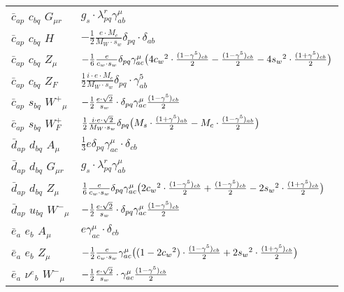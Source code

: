 \begin{center}
\begin{tabular}{|l|l|}
$\bar{c}{}_{a p }$ \phantom{-} $c{}_{b q }$ \phantom{-} ${G}_{\mu r }$ \phantom{-}  &
	$ g_s\cdot \lambda_{p q}^r \gamma_{a b}^\mu $\\[2mm]
$\bar{c}{}_{a p }$ \phantom{-} $c{}_{b q }$ \phantom{-} ${H}_{}$ \phantom{-}  &
	$-\frac{1}{2}\frac{ e \cdot M_c}{ M_W \cdot s_w}\delta_{p q} \cdot \delta_{a b} $\\[2mm]
$\bar{c}{}_{a p }$ \phantom{-} $c{}_{b q }$ \phantom{-} ${Z}_{\mu }$ \phantom{-}  &
	$-\frac{1}{6}\frac{ e}{ c_w \cdot s_w}\delta_{p q} \gamma_{a c}^\mu \big(4 c_w{}^2 \cdot {(1-\gamma^5)_{c b}\over 2} -{(1-\gamma^5)_{c b}\over 2} -4 s_w{}^2 \cdot {(1+\gamma^5)_{c b}\over 2} \big)$\\[2mm]
$\bar{c}{}_{a p }$ \phantom{-} $c{}_{b q }$ \phantom{-} $Z_F{}_{}$ \phantom{-}  &
	$\frac{1}{2}\frac{ i \cdot e \cdot M_c}{ M_W \cdot s_w}\delta_{p q} \cdot \gamma_{a b}^5 $\\[2mm]
$\bar{c}{}_{a p }$ \phantom{-} $s{}_{b q }$ \phantom{-} $W^+{}_{\mu }$ \phantom{-}  &
	$-\frac{1}{2}\frac{ e \cdot\sqrt{2}}{ s_w}\cdot \delta_{p q} \gamma_{a c}^\mu {(1-\gamma^5)_{c b}\over 2} $\\[2mm]
$\bar{c}{}_{a p }$ \phantom{-} $s{}_{b q }$ \phantom{-} $W^+_F{}_{}$ \phantom{-}  &
	$\frac{1}{2}\frac{ i \cdot e \cdot\sqrt{2}}{ M_W \cdot s_w}\delta_{p q} \big( M_s\cdot {(1+\gamma^5)_{a b}\over 2} - M_c\cdot {(1-\gamma^5)_{a b}\over 2} \big)$\\[2mm]
$\bar{d}{}_{a p }$ \phantom{-} $d{}_{b q }$ \phantom{-} ${A}_{\mu }$ \phantom{-}  &
	$\frac{1}{3} e\delta_{p q} \gamma_{a c}^\mu \cdot \delta_{c b} $\\[2mm]
$\bar{d}{}_{a p }$ \phantom{-} $d{}_{b q }$ \phantom{-} ${G}_{\mu r }$ \phantom{-}  &
	$ g_s\cdot \lambda_{p q}^r \gamma_{a b}^\mu $\\[2mm]
$\bar{d}{}_{a p }$ \phantom{-} $d{}_{b q }$ \phantom{-} ${Z}_{\mu }$ \phantom{-}  &
	$\frac{1}{6}\frac{ e}{ c_w \cdot s_w}\delta_{p q} \gamma_{a c}^\mu \big(2 c_w{}^2 \cdot {(1-\gamma^5)_{c b}\over 2} +{(1-\gamma^5)_{c b}\over 2} -2 s_w{}^2 \cdot {(1+\gamma^5)_{c b}\over 2} \big)$\\[2mm]
$\bar{d}{}_{a p }$ \phantom{-} $u{}_{b q }$ \phantom{-} $W^-{}_{\mu }$ \phantom{-}  &
	$-\frac{1}{2}\frac{ e \cdot\sqrt{2}}{ s_w}\cdot \delta_{p q} \gamma_{a c}^\mu {(1-\gamma^5)_{c b}\over 2} $\\[2mm]
$\bar{e}{}_{a }$ \phantom{-} $e{}_{b }$ \phantom{-} ${A}_{\mu }$ \phantom{-}  &
	$ e\gamma_{a c}^\mu \cdot \delta_{c b} $\\[2mm]
$\bar{e}{}_{a }$ \phantom{-} $e{}_{b }$ \phantom{-} ${Z}_{\mu }$ \phantom{-}  &
	$-\frac{1}{2}\frac{ e}{ c_w \cdot s_w}\gamma_{a c}^\mu \big( (1-2 c_w {}^2)\cdot {(1-\gamma^5)_{c b}\over 2} +2 s_w{}^2 \cdot {(1+\gamma^5)_{c b}\over 2} \big)$\\[2mm]
$\bar{e}{}_{a }$ \phantom{-} $\nu^e{}_{b }$ \phantom{-} $W^-{}_{\mu }$ \phantom{-}  &
	$-\frac{1}{2}\frac{ e \cdot\sqrt{2}}{ s_w}\cdot \gamma_{a c}^\mu {(1-\gamma^5)_{c b}\over 2} $\\ \hline
\end{tabular}


\end{center}
